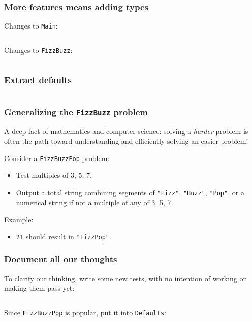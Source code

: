 \begin{frame}[fragile]
  \frametitle{More features means adding types}

  Changes to \texttt{Main}:
  \inputminted{scala}{Main5.scala}

  Changes to \texttt{FizzBuzz}:
  \inputminted{scala}{FizzBuzz3.scala}
\end{frame}

\begin{frame}
  \frametitle{Extract defaults}

  \inputminted{scala}{Defaults1.scala}
\end{frame}

%

\begin{frame}
  \frametitle{Generalizing the \texttt{FizzBuzz} problem}

  A deep fact of mathematics and computer science: solving a \emph{harder} problem is often the path toward understanding and efficiently solving an easier problem!

  Consider a \texttt{FizzBuzzPop} problem:
  \begin{itemize}
  \item Test multiples of 3, 5, 7.
  \item Output a total string combining segments of \texttt{"Fizz"}, \texttt{"Buzz"}, \texttt{"Pop"}, or a numerical string if not a multiple of any of 3, 5, 7.
  \end{itemize}

  Example:
  \begin{itemize}
  \item \texttt{21} should result in \texttt{"FizzPop"}.
  \end{itemize}
\end{frame}

\begin{frame}[fragile]
  \frametitle{Document all our thoughts}

  To clarify our thinking, write some new tests, with no intention of working on making them pass yet:
  \inputminted{scala}{FizzBuzzSpec5.scala}

  Since \texttt{FizzBuzzPop} is popular, put it into \texttt{Defaults}:
  \inputminted{scala}{Defaults2.scala}
\end{frame}

